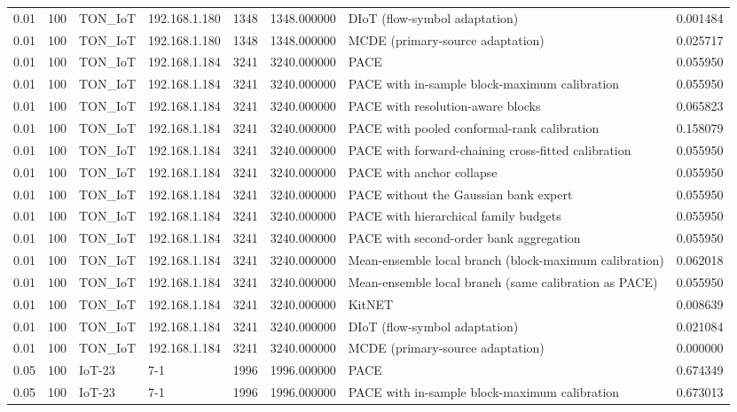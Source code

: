 \begin{tabular}{llllllll}
0.01 & 100 & TON\_IoT & 192.168.1.180 & 1348 & 1348.000000 & DIoT (flow-symbol adaptation) & 0.001484 \\
0.01 & 100 & TON\_IoT & 192.168.1.180 & 1348 & 1348.000000 & MCDE (primary-source adaptation) & 0.025717 \\
0.01 & 100 & TON\_IoT & 192.168.1.184 & 3241 & 3240.000000 & PACE & 0.055950 \\
0.01 & 100 & TON\_IoT & 192.168.1.184 & 3241 & 3240.000000 & PACE with in-sample block-maximum calibration & 0.055950 \\
0.01 & 100 & TON\_IoT & 192.168.1.184 & 3241 & 3240.000000 & PACE with resolution-aware blocks & 0.065823 \\
0.01 & 100 & TON\_IoT & 192.168.1.184 & 3241 & 3240.000000 & PACE with pooled conformal-rank calibration & 0.158079 \\
0.01 & 100 & TON\_IoT & 192.168.1.184 & 3241 & 3240.000000 & PACE with forward-chaining cross-fitted calibration & 0.055950 \\
0.01 & 100 & TON\_IoT & 192.168.1.184 & 3241 & 3240.000000 & PACE with anchor collapse & 0.055950 \\
0.01 & 100 & TON\_IoT & 192.168.1.184 & 3241 & 3240.000000 & PACE without the Gaussian bank expert & 0.055950 \\
0.01 & 100 & TON\_IoT & 192.168.1.184 & 3241 & 3240.000000 & PACE with hierarchical family budgets & 0.055950 \\
0.01 & 100 & TON\_IoT & 192.168.1.184 & 3241 & 3240.000000 & PACE with second-order bank aggregation & 0.055950 \\
0.01 & 100 & TON\_IoT & 192.168.1.184 & 3241 & 3240.000000 & Mean-ensemble local branch (block-maximum calibration) & 0.062018 \\
0.01 & 100 & TON\_IoT & 192.168.1.184 & 3241 & 3240.000000 & Mean-ensemble local branch (same calibration as PACE) & 0.055950 \\
0.01 & 100 & TON\_IoT & 192.168.1.184 & 3241 & 3240.000000 & KitNET & 0.008639 \\
0.01 & 100 & TON\_IoT & 192.168.1.184 & 3241 & 3240.000000 & DIoT (flow-symbol adaptation) & 0.021084 \\
0.01 & 100 & TON\_IoT & 192.168.1.184 & 3241 & 3240.000000 & MCDE (primary-source adaptation) & 0.000000 \\
0.05 & 100 & IoT-23 & 7-1 & 1996 & 1996.000000 & PACE & 0.674349 \\
0.05 & 100 & IoT-23 & 7-1 & 1996 & 1996.000000 & PACE with in-sample block-maximum calibration & 0.673013 \\

\end{tabular}
